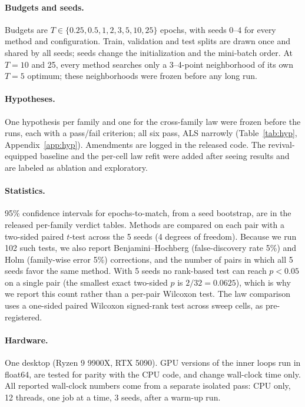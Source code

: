 \documentclass[10pt]{article}
\begin{document}
\paragraph{Budgets and seeds.} Budgets are $T \in \{0.25, 0.5, 1, 2, 3, 5, 10, 25\}$ epochs, with seeds 0--4 for
every method and configuration. Train, validation and test splits are drawn once and shared by all seeds; seeds change
the initialization and the mini-batch order. At $T = 10$ and 25, every
method searches only a 3--4-point neighborhood of its own $T = 5$ optimum; these neighborhoods were frozen before any
long run.

\paragraph{Hypotheses.} One hypothesis per family and one for the cross-family law were frozen before the runs, each
with a pass/fail criterion; all six pass, ALS narrowly (Table~\ref{tab:hyp}, Appendix~\ref{app:hyp}).
Amendments are logged in the released code. The revival-equipped baseline and the per-cell law refit were added after
seeing results and are labeled as ablation and exploratory.

\paragraph{Statistics.} 95\% confidence intervals for epochs-to-match, from a seed bootstrap, are in the released
per-family verdict tables. Methods are
compared on each pair with a two-sided paired $t$-test across the 5 seeds (4 degrees of freedom). Because we run 102
such tests, we also report Benjamini--Hochberg (false-discovery rate 5\%) and Holm (family-wise error 5\%)
corrections, and the number of pairs in which all 5 seeds favor the same method. With 5 seeds no rank-based test can
reach $p < 0.05$ on a single pair (the smallest exact two-sided $p$ is $2/32 = 0.0625$), which is why we report this
count rather than a per-pair Wilcoxon test. The law comparison uses a one-sided paired Wilcoxon signed-rank test
across sweep cells, as pre-registered.

\paragraph{Hardware.} One desktop (Ryzen 9 9900X, RTX 5090). GPU versions of the inner loops run in float64, are
tested for parity with the CPU code, and change wall-clock time only. All reported wall-clock numbers come from a
separate isolated pass: CPU only, 12 threads, one job at a time, 3 seeds, after a warm-up run.
\end{document}
